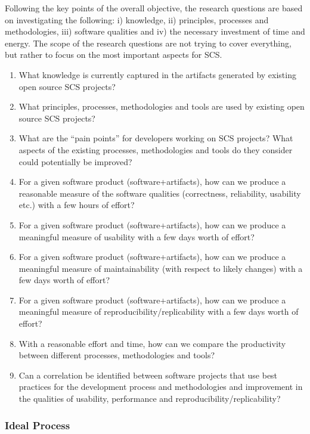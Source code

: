 \documentclass[12pt]{article}
\begin{document}
Following the key points of the overall objective, the research questions are
based on investigating the following: i) knowledge, ii) principles, processes
and methodologies, iii) software qualities and iv) the necessary investment of
time and energy.  The scope of the research questions are not trying to cover
everything, but rather to focus on the most important aspects for SCS.

\begin{enumerate}
\item What knowledge is currently captured in the artifacts generated by
  existing open source SCS projects?
\item What principles, processes, methodologies and tools are used by existing
  open source SCS projects?
\item What are the ``pain points'' for developers working on SCS projects?  What
  aspects of the existing processes, methodologies and tools do they consider
  could potentially be improved?
\item For a given software product (software+artifacts), how can we produce a
  reasonable measure of the software qualities (correctness, reliability,
  usability etc.) with a few hours of effort?
\item For a given software product (software+artifacts), how can we produce a
  meaningful measure of usability with a few days worth of effort?
\item For a given software product (software+artifacts), how can we produce a
  meaningful measure of maintainability (with respect to likely changes) with a
  few days worth of effort?
\item For a given software product (software+artifacts), how can we produce a
  meaningful measure of reproducibility/replicability with a few days worth of
  effort?
\item With a reasonable effort and time, how can we compare the productivity
  between different processes, methodologies and tools?
\item Can a correlation be identified between software projects that use best
  practices for the development process and methodologies and improvement in the
  qualities of usability, performance and reproducibility/replicability?
\end{enumerate}

\subsubsection*{Ideal Process}
\end{document}
